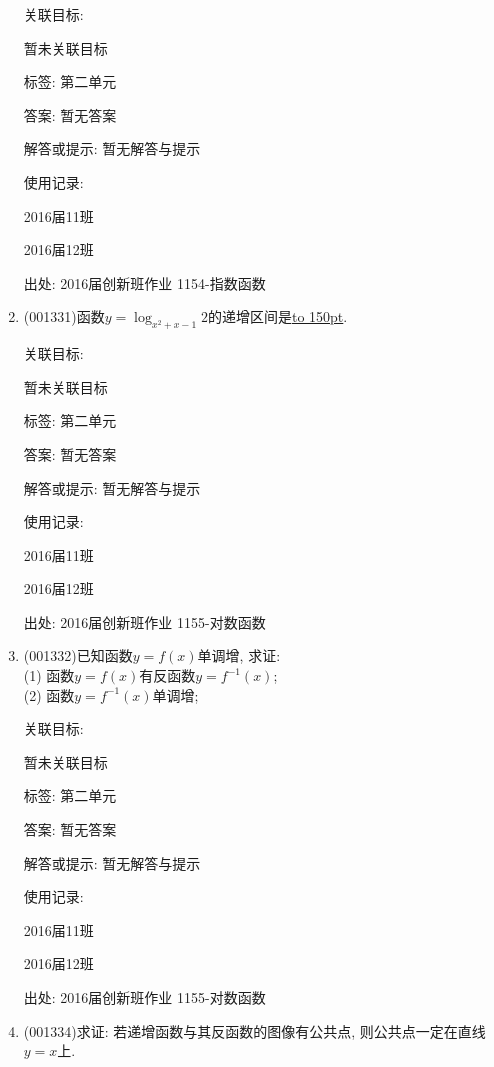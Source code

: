 \documentclass[10pt,a4paper]{article}
\newcommand{\blank}[1]{\underline{\hbox to #1pt{}}}
\begin{document}
\begin{enumerate}[1.]
关联目标:

暂未关联目标



标签: 第二单元

答案: 暂无答案

解答或提示: 暂无解答与提示

使用记录:

2016届11班			

2016届12班			


出处: 2016届创新班作业	1154-指数函数
\item { (001331)}函数$y=\log_{x^2+x-1} 2$的递增区间是\blank{150}.


关联目标:

暂未关联目标



标签: 第二单元

答案: 暂无答案

解答或提示: 暂无解答与提示

使用记录:

2016届11班	

2016届12班	


出处: 2016届创新班作业	1155-对数函数
\item { (001332)}已知函数$y=f(x)$单调增, 求证:\\ 
(1) 函数$y=f(x)$有反函数$y=f^{-1}(x)$;\\ 
(2) 函数$y=f^{-1}(x)$单调增;


关联目标:

暂未关联目标



标签: 第二单元

答案: 暂无答案

解答或提示: 暂无解答与提示

使用记录:

2016届11班		

2016届12班		


出处: 2016届创新班作业	1155-对数函数
\item { (001334)}求证: 若递增函数与其反函数的图像有公共点, 则公共点一定在直线$y=x$上.



\end{enumerate}
\end{document}
